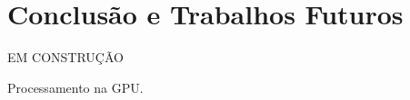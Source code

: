 \section{Conclusão e Trabalhos Futuros}
\label{sec:conclusao}

EM CONSTRUÇÃO

Processamento na GPU.
